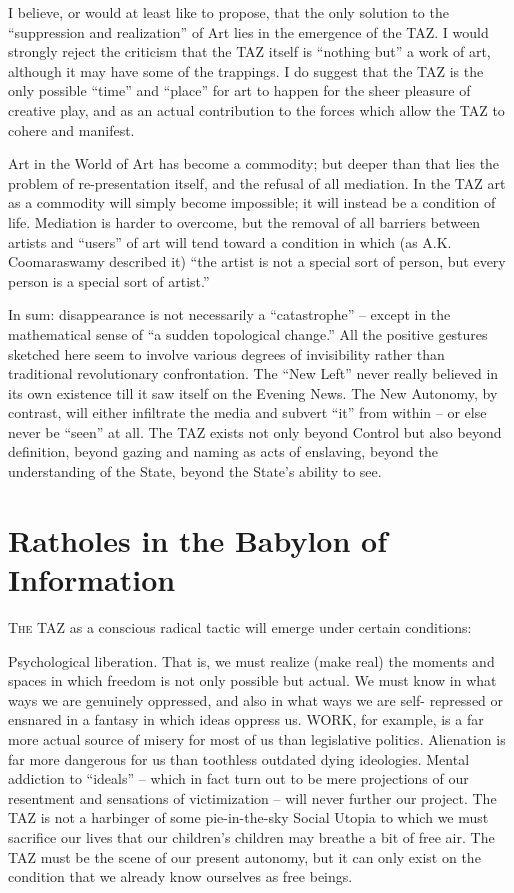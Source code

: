 \documentclass[a4paper,english,10pt,twoside]{article}
\begin{document}
\medskip
I believe, or would at least like to propose, that the only solution to the \enquote{suppression and realization} of Art lies in the emergence of the TAZ. I would strongly reject the criticism that the TAZ itself is \enquote{nothing but} a work of art, although it may have some of the trappings. I do suggest that the TAZ is the only possible \enquote{time} and \enquote{place} for art to happen for the sheer pleasure of creative play, and as an actual contribution to the forces which allow the TAZ to cohere and manifest.

\medskip
Art in the World of Art has become a commodity; but deeper than that lies the problem of re-presentation itself, and the refusal of all mediation. In the TAZ art as a commodity will simply become impossible; it will instead be a condition of life. Mediation is harder to overcome, but the removal of all barriers between artists and \enquote{users} of art will tend toward a condition in which (as A.K. Coomaraswamy described it) \enquote{the artist is not a special sort of person, but every person is a special sort of artist.}

\medskip
In sum: disappearance is not necessarily a \enquote{catastrophe} --  except in the mathematical sense of \enquote{a sudden topological change.} All the positive gestures sketched here seem to involve various degrees of invisibility rather than traditional revolutionary confrontation. The \enquote{New Left} never really believed in its own existence till it saw itself on the Evening News. The New Autonomy, by contrast, will either infiltrate the media and subvert \enquote{it} from within -- or else never be \enquote{seen} at all. The TAZ exists not only beyond Control but also beyond definition, beyond gazing and naming as acts of enslaving, beyond the understanding of the State, beyond the State's ability to see.

\section{Ratholes in the Babylon of Information}

\lettrine{T}{he} TAZ as a conscious radical tactic will emerge under certain conditions:

\medskip
Psychological liberation. That is, we must realize (make real) the moments and spaces in which freedom is not only possible but actual. We must know in what ways we are genuinely oppressed, and also in what ways we are self- repressed or ensnared in a fantasy in which ideas oppress us. WORK, for example, is a far more actual source of misery for most of us than legislative politics. Alienation is far more dangerous for us than toothless outdated dying ideologies. Mental addiction to \enquote{ideals} -- which in fact turn out to be mere projections of our resentment and sensations of victimization -- will never further our project. The TAZ is not a harbinger of some pie-in-the-sky Social Utopia to which we must sacrifice our lives that our children's children may breathe a bit of free air. The TAZ must be the scene of our present autonomy, but it can only exist on the condition that we already know ourselves as free beings.
\end{document}
